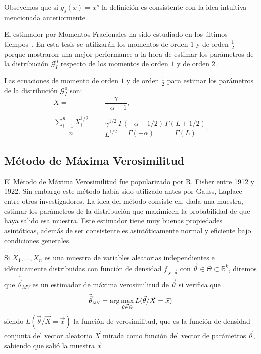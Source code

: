 Obsevemos que si $g_s(x)=x^s$ la definición es consistente con la idea intuitiva mencionada anteriormente.
%

El estimador por Momentos Fracionales ha sido estudiado en los últimos tiempos~\cite{Frery97,GambiniSC08,Khan2013}. En esta tesis se utilizarán los momentos de orden $1$ y de orden $\frac{1}{2}$ porque mostraron una mejor performance a la hora de estimar los parámetros de la distribución $\mathcal G_I^0$ respecto de los momentos de orden $1$ y de orden $2$.

Las ecuaciones de momento de orden $1$ y de orden $\frac{1}{2}$ para estimar los parámetros de la distribución $\mathcal G_I^0$ son:
\begin{align}
\overline{X}=&\dfrac{\gamma}{-\alpha - 1}, \\
\nonumber \\ 
\dfrac{\sum_{i=1}^n X_i^{1/2}}{n}=&\dfrac{\gamma^{1/2}}{L^{1/2}}\dfrac{\Gamma(-\alpha - 1/2)}{\Gamma(-\alpha)}\dfrac{\Gamma(L+ 1/2)}{\Gamma(L)}.
\end{align}


\subsection{Método de Máxima Verosimilitud}

 El Método de Máxima Verosimilitud fue popularizado por R. Fisher entre 1912 y 1922. Sin embargo este método había sido utilizado antes por Gauss, Laplace entre otros investigadores. La idea del método consiste en, dada una muestra, estimar los parámetros de la distribución que maximicen la probabilidad de que haya salido esa muestra. Este estimador tiene muy buenas propiedades asintóticas, además de ser consistente es asintóticamente normal y eficiente bajo condiciones generales.

\begin{definition}
Si $X_1, \ldots, X_n$ es una muestra de variables aleatorias independientes e idénticamente distribuidas con función de densidad $f_{X;\vec{\theta}}$  con $\vec{\theta} \in \Theta \subset \mathbb{R}^k$, diremos que $\widehat{\vec{\theta}}_{MV}$ es un estimador de máxima verosimilitud de $\vec{\theta}$ si verifica que 
\begin{align}
\widehat{\vec{\theta}}_{{\text{\tiny{MV}}}}=\arg\max_{\vec{\theta \in \Theta}} L(\vec{\theta}/\vec{X}=\vec{x})
\end{align}
siendo $L(\vec{\theta}/\vec{X}=\vec{x})$ la función de verosimilitud, que es la función de densidad conjunta del vector aleatorio $\vec{X}$ mirada como función del vector de parámetros $\vec{\theta}$, sabiendo que salió la muestra $\vec{x}$.
\end{definition}

